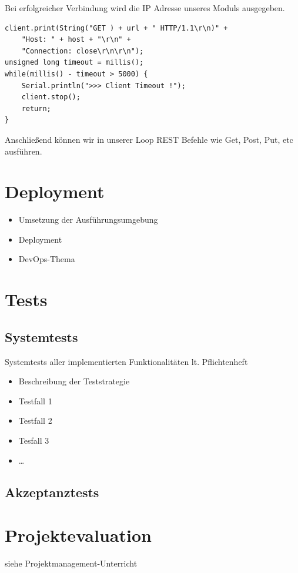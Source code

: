 Bei erfolgreicher Verbindung wird die IP Adresse unseres Moduls ausgegeben.

\begin{lstlisting}[caption=Ausführung der REST Befehle]
client.print(String("GET ) + url + " HTTP/1.1\r\n)" +
	"Host: " + host + "\r\n" + 
	"Connection: close\r\n\r\n");
unsigned long timeout = millis();
while(millis() - timeout > 5000) {
	Serial.println(">>> Client Timeout !");
	client.stop();
	return;
}
\end{lstlisting}
Anschließend können wir in unserer Loop REST Befehle wie Get, Post, Put, etc ausführen.




\chapter{Deployment}
\begin{itemize}
	\item Umsetzung der Ausführungsumgebung
	\item Deployment
	\item DevOps-Thema
\end{itemize}

\chapter{Tests}

\section{Systemtests} 
Systemtests aller implementierten Funktionalitäten lt. Pflichtenheft
\begin{itemize}
	\item Beschreibung der Teststrategie
	\item Testfall 1
	\item Testfall 2
	\item Tesfall 3
	\item …
\end{itemize}

\section{Akzeptanztests}

\chapter{Projektevaluation}
siehe Projektmanagement-Unterricht

